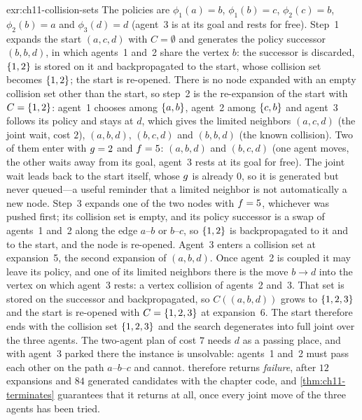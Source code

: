 \begin{solution}{exr:ch11-collision-sets}
The policies are $\phi_1(a) = b$, $\phi_1(b) = c$, $\phi_2(c) = b$, $\phi_2(b) = a$ and $\phi_3(d) = d$ (agent~3 is at its goal and rests for free). Step~1 expands the start $(a, c, d)$ with $C = \emptyset$ and generates the policy successor $(b, b, d)$, in which agents~1 and~2 share the vertex $b$: the successor is discarded, $\left\{ 1,2 \right\}$ is stored on it and backpropagated to the start, whose collision set becomes $\left\{ 1,2 \right\}$; the start is re-opened. There is no node expanded with an empty collision set other than the start, so step~2 is the re-expansion of the start with $C = \left\{ 1,2 \right\}$: agent~1 chooses among $\left\{ a, b \right\}$, agent~2 among $\left\{ c, b \right\}$ and agent~3 follows its policy and stays at $d$, which gives the limited neighbors $(a, c, d)$ (the joint wait, cost $2$), $(a, b, d)$, $(b, c, d)$ and $(b, b, d)$ (the known collision). Two of them enter \Open with $g = 2$ and $f = 5$: $(a, b, d)$ and $(b, c, d)$ (one agent moves, the other waits away from its goal, agent~3 rests at its goal for free). The joint wait leads back to the start itself, whose $g$ is already $0$, so it is generated but never queued---a useful reminder that a limited neighbor is not automatically a new node. Step~3 expands one of the two nodes with $f = 5$, whichever was pushed first; its collision set is empty, and its policy successor is a swap of agents~1 and~2 along the edge $a$--$b$ or $b$--$c$, so $\left\{ 1,2 \right\}$ is backpropagated to it and to the start, and the node is re-opened. Agent~3 enters a collision set at expansion~5, the second expansion of $(a, b, d)$. Once agent~2 is coupled it may leave its policy, and one of its limited neighbors there is the move $b \to d$ into the vertex on which agent~3 rests: a vertex collision of agents~2 and~3. That set is stored on the successor and backpropagated, so $C((a, b, d))$ grows to $\left\{ 1,2,3 \right\}$ and the start is re-opened with $C = \left\{ 1,2,3 \right\}$ at expansion~6. The start therefore ends with the collision set $\left\{ 1,2,3 \right\}$ and the search degenerates into full joint \astar over the three agents. The two-agent plan of cost $7$ needs $d$ as a passing place, and with agent~3 parked there the instance is unsolvable: agents~1 and~2 must pass each other on the path $a$--$b$--$c$ and cannot. \mstar therefore returns \emph{failure}, after $12$ expansions and $84$ generated candidates with the chapter code, and \cref{thm:ch11-terminates} guarantees that it returns at all, once every joint move of the three agents has been tried.
\end{solution}

